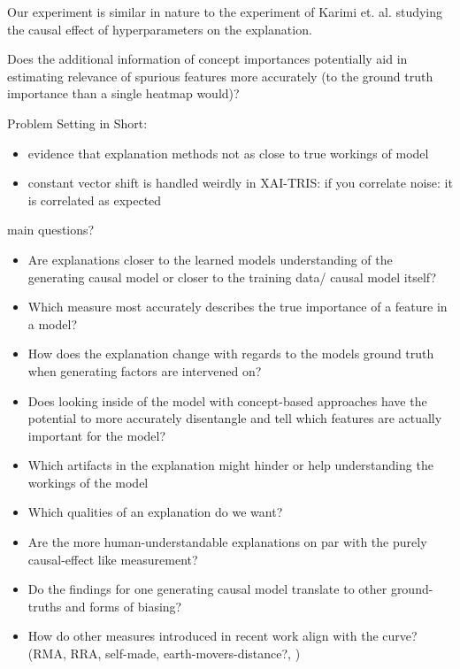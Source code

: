 {Our experiment is similar in nature to the experiment of Karimi et. al. \cite{Karimi2023} studying the causal effect of hyperparameters on the explanation.

Does the additional information of concept importances potentially aid in estimating
relevance of spurious features  more accurately (to the ground truth importance than a single heatmap would)?

Problem Setting in Short:

\begin{itemize}
    \item evidence that explanation methods not as close to true workings of model
    \item constant vector shift is handled weirdly in XAI-TRIS: if you correlate noise: it is correlated as expected
\end{itemize}


main questions?
\begin{itemize}
    \item Are explanations closer to the learned models understanding of the generating causal model or closer to the training data/ causal model itself?
    \item Which measure most accurately describes the true importance of a feature in a model?
    \item How does the explanation change with regards to the models ground truth when generating factors are intervened on?
    \item Does looking inside of the model with concept-based approaches have the potential to more accurately disentangle and tell which features are actually important for the model?
    \item Which artifacts in the explanation might hinder or help understanding the workings of the model
    \item Which qualities of an explanation do we want?
    \item Are the more human-understandable explanations on par with the purely causal-effect like measurement?
    \item Do the findings for one generating causal model translate to other ground-truths and forms of biasing?
    \item How do other measures introduced in recent work align with the curve? (RMA, RRA, self-made, earth-movers-distance?, )
\end{itemize}


}
